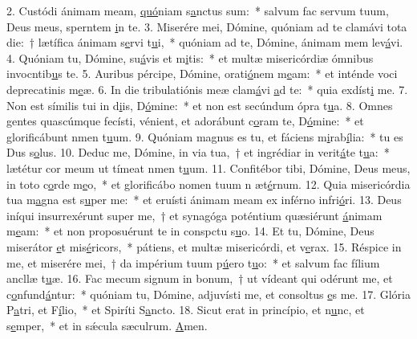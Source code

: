 2. Custódi ánimam meam, \uline{quó}niam s\uline{a}nctus sum:~* salvum fac servum tuum, Deus meus, sperntem \uline{i}n te.
3. Miserére mei, Dómine, quóniam ad te clamávi tota die:~† lætífica ánimam s\uline{e}rvi t\uline{u}i,~* quóniam ad te, Dómine, ánimam mem lev\uline{á}vi.
4. Quóniam tu, Dómine, su\uline{á}vis et m\uline{i}tis:~* et multæ misericórdiæ ómnibus invocntib\uline{u}s te.
5. Auribus pércipe, Dómine, orati\uline{ó}nem m\uline{e}am:~* et inténde voci deprecatinis m\uline{e}æ.
6. In die tribulatiónis meæ clam\uline{á}vi \uline{a}d te:~* quia exdíst\uline{i} me.
7. Non est símilis tui in d\uline{i}is, D\uline{ó}mine:~* et non est secúndum ópra t\uline{u}a.
8. Omnes gentes quascúmque fecísti, vénient, et adorábunt c\uline{o}ram te, D\uline{ó}mine:~* et glorificábunt nmen t\uline{u}um.
9. Quóniam magnus es tu, et fáciens m\uline{i}rab\uline{í}lia:~* tu es Dus s\uline{o}lus.
10. Deduc me, Dómine, in via tua,~† et ingrédiar in verit\uline{á}te t\uline{u}a:~* lætétur cor meum ut tímeat nmen t\uline{u}um.
11. Confitébor tibi, Dómine, Deus meus, in toto c\uline{o}rde m\uline{e}o,~* et glorificábo nomen tuum n æt\uline{é}rnum.
12. Quia misericórdia tua m\uline{a}gna est s\uline{u}per me:~* et eruísti ánimam meam ex inférno infri\uline{ó}ri.
13. Deus iníqui insurrexérunt super me,~† et synagóga poténtium quæsiérunt \uline{á}nimam m\uline{e}am:~* et non proposuérunt te in conspctu s\uline{u}o.
14. Et tu, Dómine, Deus miserátor \uline{e}t mis\uline{é}ricors,~* pátiens, et multæ misericórdi, et v\uline{e}rax.
15. Réspice in me, et miserére mei,~† da impérium tuum p\uline{ú}ero t\uline{u}o:~* et salvum fac fílium ancllæ t\uline{u}æ.
16. Fac mecum signum in bonum,~† ut vídeant qui odérunt me, et c\uline{o}nfund\uline{á}ntur:~* quóniam tu, Dómine, adjuvísti me, et consoltus \uline{e}s me.
17. Glória P\uline{a}tri, et F\uline{í}lio,~* et Spiríti S\uline{a}ncto.
18. Sicut erat in princípio, et n\uline{u}nc, et s\uline{e}mper,~* et in sǽcula sæculrum. \uline{A}men.
